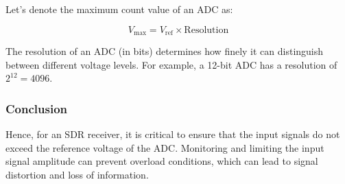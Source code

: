 Let's denote the maximum count value of an ADC as:

\[
V_{\text{max}} = V_{\text{ref}} \times \text{Resolution}
\]

The resolution of an ADC (in bits) determines how finely it can distinguish between different voltage levels. For example, a 12-bit ADC has a resolution of \( 2^{12} = 4096 \).

\subsubsection{Conclusion}

Hence, for an SDR receiver, it is critical to ensure that the input signals do not exceed the reference voltage of the ADC. Monitoring and limiting the input signal amplitude can prevent overload conditions, which can lead to signal distortion and loss of information.

\begin{center}
\end{center}
